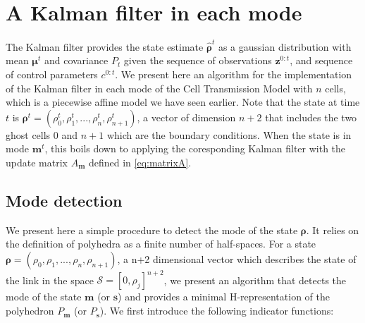 \section{A Kalman filter in each mode}

The Kalman filter provides the state estimate $\hat{\boldsymbol\rho}^{t}$ as a gaussian distribution with mean $\boldsymbol\mu^{t}$ and covariance $P_{t}$ given the sequence of observations $\boldsymbol z^{0:t}$, and sequence of control parameters $c^{0:t}$. We present here an algorithm for the implementation of the Kalman filter in each mode of the Cell Transmission Model with $n$ cells, which is a piecewise affine model we have seen earlier\footnotemark. Note that the state at time $t$ is $\boldsymbol\rho^{t} = (\rho^{t}_{0},\rho^{t}_{1},...,\rho^{t}_{n},\rho^{t}_{n+1})$, a vector of dimension $n+2$ that includes the two ghost cells $0$ and $n+1$ which are the boundary conditions. When the state is in mode $\boldsymbol m^{t}$, this boils down to applying the coresponding Kalman filter with the update matrix $A_{\boldsymbol m}$ defined in \ref{eq:matrixA}.


\subsection{Mode detection}

We present here a simple procedure to detect the mode of the state $\boldsymbol\rho$. It relies on the definition of polyhedra as a finite number of half-spaces. For a state $\boldsymbol\rho = (\rho_{0},\rho_{1},...,\rho_{n},\rho_{n+1})$, a n+2 dimensional vector which describes the state of the link in the space $\mathcal{S} = [0,\rho_{j}]^{n+2}$, we present an algorithm that detects the mode of the state $\boldsymbol m$ (or $\boldsymbol s$) and provides a minimal H-representation of the polyhedron $P_{\boldsymbol m}$ (or $P_{\boldsymbol s}$). We first introduce the following indicator functions:

